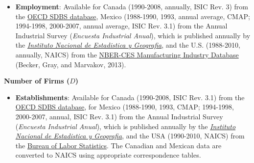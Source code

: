 \documentclass[11pt]{article}
\begin{document}
\begin{spacing}{1}
\begin{itemize}
	\item \textbf{Employment}: Available for Canada (1990-2008, annually, ISIC Rev. 3) from the \href{http://stats.oecd.org/index.aspx?queryid=224}{OECD SDBS database},  Mexico (1988-1990, 1993, annual average, CMAP; 1994-1998, 2000-2007, annual average, ISIC Rev. 3.1) from the Annual Industrial Survey (\emph{Encuesta Industrial Anual}), which is published annually by   the \href{http://buscador.inegi.org.mx/search?q=encuesta+industrial+anual&client=ProductosR&proxystylesheet=ProductosR&num=10&getfields=*&sort=meta:edicion:D:E:::D&entsp=a__inegi_politica_p72&lr=lang_es\%7Clang_en&oe=UTF-8&ie=UTF-8&ip=10.210.100.253&entqr=3&filter=0&site=ProductosBuscador&tlen=260&ulang=en&start=0}{\emph{Instituto Nacional de Estadistica y Geografia}}, and the U.S. (1988-2010, annually, NAICS) from the \href{http://www.nber.org/nberces/}{NBER-CES Manufacturing Industry Database} (Becker, Gray, and Marvakov, 2013).  	
	\end{itemize}
	
\noindent \textbf{Number of Firms ($D$)}
	\begin{itemize}
	

	\item \textbf{Establishments}: Available for Canada (1990-2008, ISIC Rev. 3.1) from the \href{http://stats.oecd.org/index.aspx?queryid=224}{OECD SDBS database}, for Mexico (1988-1990, 1993, CMAP; 1994-1998, 2000-2007, annual, ISIC Rev. 3.1) from the Annual Industrial Survey (\emph{Encuesta Industrial Anual}), which is published annually by   the \href{http://buscador.inegi.org.mx/search?q=encuesta+industrial+anual&client=ProductosR&proxystylesheet=ProductosR&num=10&getfields=*&sort=meta:edicion:D:E:::D&entsp=a__inegi_politica_p72&lr=lang_es\%7Clang_en&oe=UTF-8&ie=UTF-8&ip=10.210.100.253&entqr=3&filter=0&site=ProductosBuscador&tlen=260&ulang=en&start=0}{\emph{Instituto Nacional de Estadistica y Geografia}}, and the USA (1990-2010, NAICS) from the \href{http://www.bls.gov/cew/doc/titles/ownership/ownership_titles.htm}{Bureau of Labor Statistics}. The Canadian and Mexican data are converted to NAICS using appropriate correspondence tables. 
		

\end{itemize}
\end{spacing}
\end{document}
